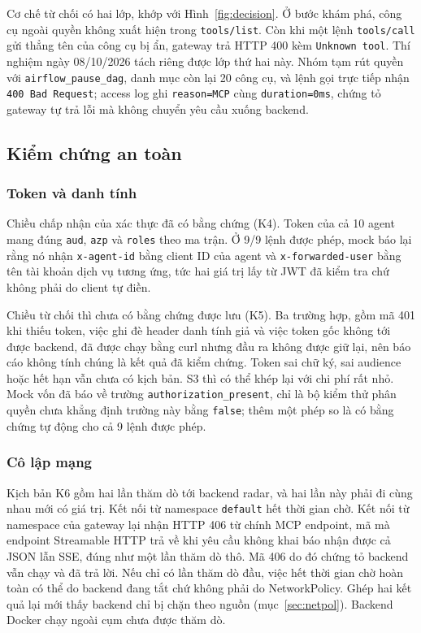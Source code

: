 Cơ chế từ chối có hai lớp, khớp với Hình~\ref{fig:decision}. Ở bước khám phá, công cụ ngoài quyền không xuất hiện trong \texttt{tools/list}. Còn khi một lệnh \texttt{tools/call} gửi thẳng tên của công cụ bị ẩn, gateway trả HTTP 400 kèm \texttt{Unknown tool}. Thí nghiệm ngày 08/10/2026 tách riêng được lớp thứ hai này. Nhóm tạm rút quyền với \texttt{airflow\_pause\_dag}, danh mục còn lại 20 công cụ, và lệnh gọi trực tiếp nhận \texttt{400 Bad Request}; access log ghi \texttt{reason=MCP} cùng \texttt{duration=0ms}, chứng tỏ gateway tự trả lỗi mà không chuyển yêu cầu xuống backend.

\subsection{Kiểm chứng an toàn}

\subsubsection{Token và danh tính}

Chiều chấp nhận của xác thực đã có bằng chứng (K4). Token của cả 10 agent mang đúng \texttt{aud}, \texttt{azp} và \texttt{roles} theo ma trận. Ở 9/9 lệnh được phép, mock báo lại rằng nó nhận \texttt{x-agent-id} bằng client ID của agent và \texttt{x-forwarded-user} bằng tên tài khoản dịch vụ tương ứng, tức hai giá trị lấy từ JWT đã kiểm tra chứ không phải do client tự điền.

Chiều từ chối thì chưa có bằng chứng được lưu (K5). Ba trường hợp, gồm mã 401 khi thiếu token, việc ghi đè header danh tính giả và việc token gốc không tới được backend, đã được chạy bằng curl nhưng đầu ra không được giữ lại, nên báo cáo không tính chúng là kết quả đã kiểm chứng. Token sai chữ ký, sai audience hoặc hết hạn vẫn chưa có kịch bản. S3 thì có thể khép lại với chi phí rất nhỏ. Mock vốn đã báo về trường \texttt{authorization\_present}, chỉ là bộ kiểm thử phân quyền chưa khẳng định trường này bằng \texttt{false}; thêm một phép so là có bằng chứng tự động cho cả 9 lệnh được phép.

\subsubsection{Cô lập mạng}

Kịch bản K6 gồm hai lần thăm dò tới backend radar, và hai lần này phải đi cùng nhau mới có giá trị. Kết nối từ namespace \texttt{default} hết thời gian chờ. Kết nối từ namespace của gateway lại nhận HTTP 406 từ chính MCP endpoint, mã mà endpoint Streamable HTTP trả về khi yêu cầu không khai báo nhận được cả JSON lẫn SSE, đúng như một lần thăm dò thô. Mã 406 do đó chứng tỏ backend vẫn chạy và đã trả lời. Nếu chỉ có lần thăm dò đầu, việc hết thời gian chờ hoàn toàn có thể do backend đang tắt chứ không phải do NetworkPolicy. Ghép hai kết quả lại mới thấy backend chỉ bị chặn theo nguồn (mục~\ref{sec:netpol}). Backend Docker chạy ngoài cụm chưa được thăm dò.

